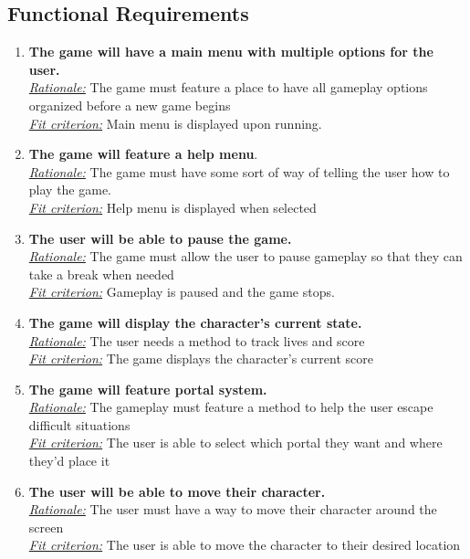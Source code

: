 \documentclass[12pt, titlepage]{article}
\begin{document}
\subsection{Functional Requirements}
\begin{enumerate}
\item \textbf{The game will have a main menu with multiple options for the user.} \\
\underline{\textit{Rationale:}}  The game must feature a place to have all gameplay options organized before a new game begins\\
\underline{\textit{Fit criterion:}} Main menu is displayed upon running.\\

\item \textbf{The game will feature a help menu}.\\
\underline{\textit{Rationale:}} The game must have some sort of way of telling the user how to play the game.\\
\underline{\textit{Fit criterion:}} Help menu is displayed when selected\\

\item \textbf{The user will be able to pause the game.}\\
\underline{\textit{Rationale:}} The game must allow the user to pause gameplay so that they can take a break when needed\\
\underline{\textit{Fit criterion:}} Gameplay is paused and the game stops.\\

\item \textbf{The game will display the character's current state.}\\
\underline{\textit{Rationale:}} The user needs a method to track lives and score\\
\underline{\textit{Fit criterion:}} The game displays the character's current score\\

\item \textbf{The game will feature portal system.}\\
\underline{\textit{Rationale:}} The gameplay must feature a method to help the user escape difficult situations\\
\underline{\textit{Fit criterion:}} The user is able to select which portal they want and where they'd place it\\

\item \textbf{The user will be able to move their character.}\\
\underline{\textit{Rationale:}} The user must have a way to move their character around the screen\\
\underline{\textit{Fit criterion:}} The user is able to move the character to their desired location\\


\end{enumerate}
\end{document}

